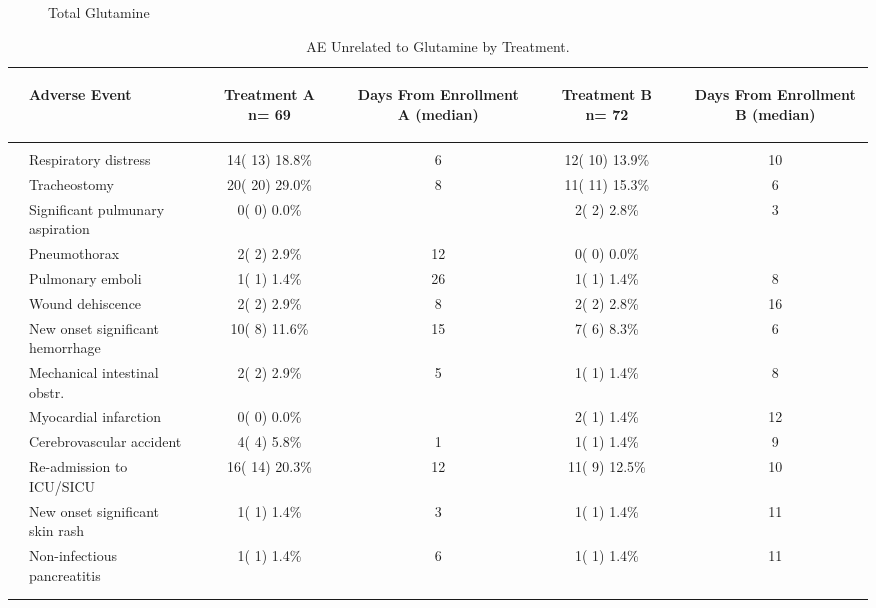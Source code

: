 \documentclass[dvips, 10pt]{article}
\begin{document}
\begin{figure}
\caption{Total Glutamine}
\end{figure}
\clearpage
\begin{table}[t]
\caption
{ AE Unrelated to Glutamine by Treatment. }
\begin{center}
\begin{tabular}{ @{}l@{}
@{}l@{}@{}p{1.5em}@{}@{}c@{}@{}p{1.5em}@{}@{}c@{}@{}p{1.5em}@{}@{}c@{}@{}p{1.5em}@{}@{}c@{}
}
\hline

& \parbox{6em}{\begin{center}Adverse Event\end{center}} && \parbox{6em}{\begin{center}Treatment A n= 69\end{center}} && \parbox{6em}{\begin{center}Days From Enrollment A (median)\end{center}} && \parbox{6em}{\begin{center}Treatment B n= 72\end{center}} && \parbox{6em}{\begin{center}Days From Enrollment B (median)\end{center}} \\

\hline

\\
& Respiratory distress && 14( 13) 18.8\% && 6 && 12( 10) 13.9\% && 10 \\
& Tracheostomy && 20( 20) 29.0\% && 8 && 11( 11) 15.3\% && 6 \\
& Significant pulmunary aspiration && 0(  0)  0.0\% &&  && 2(  2)  2.8\% && 3 \\
& Pneumothorax && 2(  2)  2.9\% && 12 && 0(  0)  0.0\% &&  \\
& Pulmonary emboli && 1(  1)  1.4\% && 26 && 1(  1)  1.4\% && 8 \\
& Wound dehiscence && 2(  2)  2.9\% && 8 && 2(  2)  2.8\% && 16 \\
& New onset significant hemorrhage && 10(  8) 11.6\% && 15 && 7(  6)  8.3\% && 6 \\
& 
Mechanical intestinal obstr. && 2(  2)  2.9\% && 5 && 1(  1)  1.4\% && 8 \\
& Myocardial infarction && 0(  0)  0.0\% &&  && 2(  1)  1.4\% && 12 \\
& Cerebrovascular accident && 4(  4)  5.8\% && 1 && 1(  1)  1.4\% && 9 \\
& Re-admission to ICU/SICU && 16( 14) 20.3\% && 12 && 11(  9) 12.5\% && 10 \\
& New onset significant skin rash && 1(  1)  1.4\% && 3 && 1(  1)  1.4\% && 11 \\
& 
Non-infectious pancreatitis && 1(  1)  1.4\% && 6 && 1(  1)  1.4\% && 11 \\
\\
\hline \\


\end{tabular}
\end{center}
\end{table}
\end{document}
